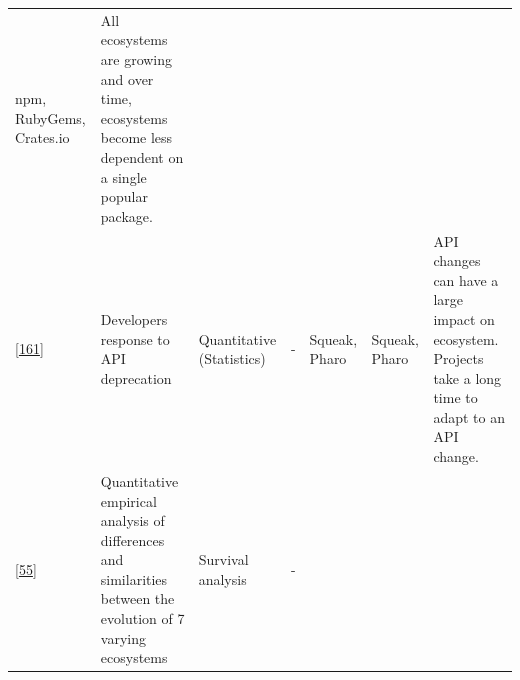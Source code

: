 \documentclass[]{book}
\begin{document}
\begin{longtable}[]{@{}lllllll@{}}
\begin{minipage}[t]{0.12\columnwidth}
npm, RubyGems, Crates.io\strut
\end{minipage} & \begin{minipage}[t]{0.10\columnwidth}\raggedright\strut
All ecosystems are growing and over time, ecosystems become less
dependent on a single popular package.\strut
\end{minipage}\tabularnewline
\begin{minipage}[t]{0.09\columnwidth}\raggedright\strut
{[}\protect\hyperlink{ref-Robbes2012}{161}{]}\strut
\end{minipage} & \begin{minipage}[t]{0.16\columnwidth}\raggedright\strut
Developers response to API deprecation\strut
\end{minipage} & \begin{minipage}[t]{0.17\columnwidth}\raggedright\strut
Quantitative (Statistics)\strut
\end{minipage} & \begin{minipage}[t]{0.07\columnwidth}\raggedright\strut
-\strut
\end{minipage} & \begin{minipage}[t]{0.10\columnwidth}\raggedright\strut
Squeak, Pharo\strut
\end{minipage} & \begin{minipage}[t]{0.12\columnwidth}\raggedright\strut
Squeak, Pharo\strut
\end{minipage} & \begin{minipage}[t]{0.10\columnwidth}\raggedright\strut
API changes can have a large impact on ecosystem. Projects take a long
time to adapt to an API change.\strut
\end{minipage}\tabularnewline
\begin{minipage}[t]{0.09\columnwidth}\raggedright\strut
{[}\protect\hyperlink{ref-Decan2018}{55}{]}\strut
\end{minipage} & \begin{minipage}[t]{0.16\columnwidth}\raggedright\strut
Quantitative empirical analysis of differences and similarities between
the evolution of 7 varying ecosystems\strut
\end{minipage} & \begin{minipage}[t]{0.17\columnwidth}\raggedright\strut
Survival analysis\strut
\end{minipage} & \begin{minipage}[t]{0.07\columnwidth}\raggedright\strut
-\strut
\end{minipage} & \begin{minipage}[t]{0.10\columnwidth}\raggedright\strut

\end{minipage}
\end{longtable}
\end{document}
